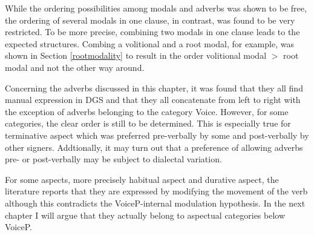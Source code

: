 \noindent While the ordering possibilities among modals and adverbs was shown to be free, the ordering of several modals in one clause, in contrast, was found to be very restricted. To be more precise, combining two modals in one clause leads to the expected structures. Combing a volitional and a root modal, for example, was shown in Section \ref{rootmodality} to result in the order volitional modal $>$ root modal and not the other way around.

Concerning the adverbs discussed in this chapter, it was found that they all find manual expression in DGS and that they all concatenate from left to right with the exception of adverbs belonging to the category Voice. However, for some categories, the clear order is still to be determined. This is especially true for terminative aspect which was preferred pre-verbally by some and post-verbally by other signers. Addtionally, it may turn out that a preference of allowing adverbs pre- or post-verbally may be subject to dialectal variation.  

For some aspects, more precisely habitual aspect and durative aspect, the literature reports that they are expressed by modifying the movement of the verb although this contradicts the VoiceP-internal modulation hypothesis. In the next chapter I will argue that they actually belong to aspectual categories below VoiceP.

